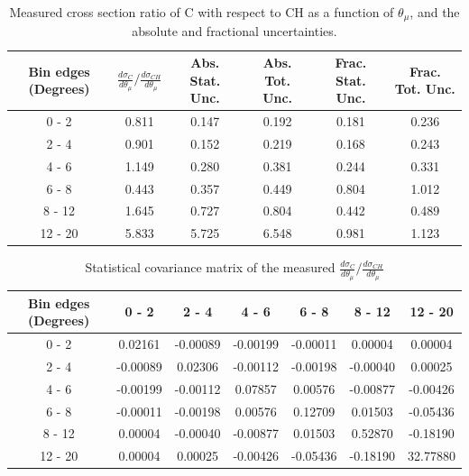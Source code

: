 \documentclass[aps,prl,twocolumn,superscriptaddress,nofootinbib]{revtex4-1}
\begin{document}
\begin{table}[h!]
  \centering
  \caption{Measured cross section ratio of C with respect to CH as a function
  of $\theta_{\mu}$,  and the absolute and fractional uncertainties.}
    \begin{tabular}{c||c||c|c||c|c}
      Bin edges (Degrees) & $\frac{d\sigma_{C}}{d\theta_{\mu}}/\frac{d\sigma_{CH}}{d\theta_{\mu}}$ & Abs. Stat. Unc. & Abs. Tot. Unc. & Frac. Stat. Unc. & Frac. Tot. Unc. \\
      \hline\hline
        0 - 2 & 0.811 & 0.147 & 0.192 & 0.181 & 0.236 \\
        2 - 4 & 0.901 & 0.152 & 0.219 & 0.168 & 0.243 \\
        4 - 6 & 1.149 & 0.280 & 0.381 & 0.244 & 0.331 \\
        6 - 8 & 0.443 & 0.357 & 0.449 & 0.804 & 1.012 \\
       8 - 12 & 1.645 & 0.727 & 0.804 & 0.442 & 0.489 \\
      12 - 20 & 5.833 & 5.725 & 6.548 & 0.981 & 1.123 \\
    \end{tabular}
  \label{table:ThetaMuXSecRatio_C}
\end{table}

\begin{table}[h!]
  \centering
  \caption{Statistical covariance matrix of the measured $\frac{d\sigma_{C}}{d\theta_{\mu}}/\frac{d\sigma_{CH}}{d\theta_{\mu}}$}
    \begin{tabular}{c||cccccc}
      Bin edges (Degrees) & 0 - 2 & 2 - 4 & 4 - 6 & 6 - 8 & 8 - 12 & 12 - 20 \\
\hline \hline
        0 - 2 &  0.02161 & -0.00089 & -0.00199 & -0.00011 &  0.00004 &  0.00004 \\
        2 - 4 & -0.00089 &  0.02306 & -0.00112 & -0.00198 & -0.00040 &  0.00025 \\
        4 - 6 & -0.00199 & -0.00112 &  0.07857 &  0.00576 & -0.00877 & -0.00426 \\
        6 - 8 & -0.00011 & -0.00198 &  0.00576 &  0.12709 &  0.01503 & -0.05436 \\
       8 - 12 &  0.00004 & -0.00040 & -0.00877 &  0.01503 &  0.52870 & -0.18190 \\
      12 - 20 &  0.00004 &  0.00025 & -0.00426 & -0.05436 & -0.18190 & 32.77880 \\
    \end{tabular}
  \label{tablecov:C_Statistical_ThetaMu}
\end{table}
\end{document}
